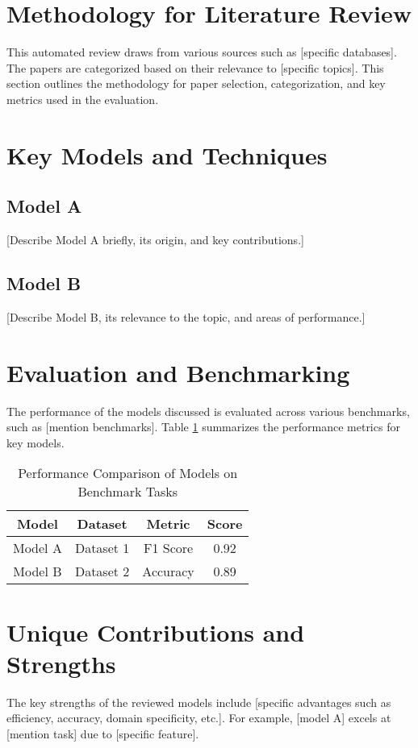 \documentclass[journal]{IEEEtran}
\begin{document}
\section{Methodology for Literature Review}
This automated review draws from various sources such as [specific databases]. The papers are categorized based on their relevance to [specific topics]. This section outlines the methodology for paper selection, categorization, and key metrics used in the evaluation.

\section{Key Models and Techniques}
\subsection{Model A}
[Describe Model A briefly, its origin, and key contributions.]

\subsection{Model B}
[Describe Model B, its relevance to the topic, and areas of performance.]

\section{Evaluation and Benchmarking}
The performance of the models discussed is evaluated across various benchmarks, such as [mention benchmarks]. Table \ref{tab:performance} summarizes the performance metrics for key models.

\begin{table}[h!]
    \centering
    \caption{Performance Comparison of Models on Benchmark Tasks}
    \begin{tabular}{|c|c|c|c|}
    \hline
    Model & Dataset & Metric & Score \\
    \hline
    Model A & Dataset 1 & F1 Score & 0.92 \\
    Model B & Dataset 2 & Accuracy & 0.89 \\
    \hline
    \end{tabular}
    \label{tab:performance}
\end{table}

\section{Unique Contributions and Strengths}
The key strengths of the reviewed models include [specific advantages such as efficiency, accuracy, domain specificity, etc.]. For example, [model A] excels at [mention task] due to [specific feature].
\end{document}
